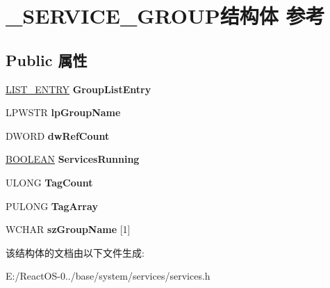 \hypertarget{struct___s_e_r_v_i_c_e___g_r_o_u_p}{}\section{\+\_\+\+S\+E\+R\+V\+I\+C\+E\+\_\+\+G\+R\+O\+U\+P结构体 参考}
\label{struct___s_e_r_v_i_c_e___g_r_o_u_p}
\subsection*{Public 属性}
\begin{DoxyCompactItemize}
\item 
\mbox{\label{struct___s_e_r_v_i_c_e___g_r_o_u_p_abb0a26c667b1ffab369f184bd2578b35}} 
\hyperlink{struct___l_i_s_t___e_n_t_r_y}{L\+I\+S\+T\+\_\+\+E\+N\+T\+RY} {\bfseries Group\+List\+Entry}
\item 
\mbox{\label{struct___s_e_r_v_i_c_e___g_r_o_u_p_af328ef9d79d4721dfc384df6af765bce}} 
L\+P\+W\+S\+TR {\bfseries lp\+Group\+Name}
\item 
\mbox{\label{struct___s_e_r_v_i_c_e___g_r_o_u_p_a5c59afcbfcea0e9651324b31a02284b5}} 
D\+W\+O\+RD {\bfseries dw\+Ref\+Count}
\item 
\mbox{\label{struct___s_e_r_v_i_c_e___g_r_o_u_p_aa60bdcee37d16713925d913e91856f54}} 
\hyperlink{_processor_bind_8h_a112e3146cb38b6ee95e64d85842e380a}{B\+O\+O\+L\+E\+AN} {\bfseries Services\+Running}
\item 
\mbox{\label{struct___s_e_r_v_i_c_e___g_r_o_u_p_aec1dbef6a8b9828fd0f1e09727b7234b}} 
U\+L\+O\+NG {\bfseries Tag\+Count}
\item 
\mbox{\label{struct___s_e_r_v_i_c_e___g_r_o_u_p_a9aa4abcf7cbe5f3cb90db3e252f65a02}} 
P\+U\+L\+O\+NG {\bfseries Tag\+Array}
\item 
\mbox{\label{struct___s_e_r_v_i_c_e___g_r_o_u_p_a7a1cb56577514ceebed4eb7ca4692d84}} 
W\+C\+H\+AR {\bfseries sz\+Group\+Name} \mbox{[}1\mbox{]}
\end{DoxyCompactItemize}


该结构体的文档由以下文件生成\+:\begin{DoxyCompactItemize}
\item 
E\+:/\+React\+O\+S-\/0../base/system/services/services.\+h\end{DoxyCompactItemize}
